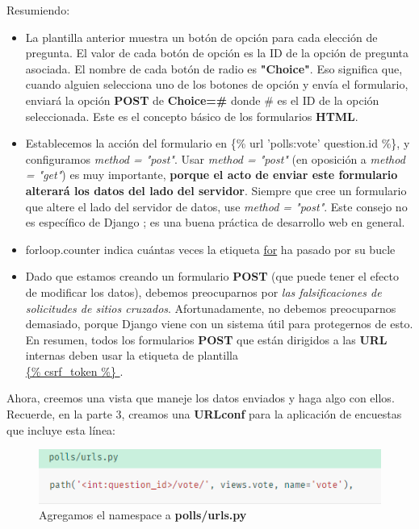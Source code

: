 \documentclass[10pt]{article}
\newcommand{\django}[1]{{\textcolor{G}{Django} #1}}
\begin{document}
Resumiendo:
\begin{itemize}
\item 
La plantilla anterior muestra un botón de opción para cada elección de pregunta. El valor de cada botón de opción es la ID de la opción de pregunta asociada. El nombre de cada botón de radio es \textbf{"Choice"}. Eso significa que, cuando alguien selecciona uno de los botones de opción y envía el formulario, enviará la opción \textbf{POST} de \textbf{Choice=\#} donde \# es el ID de la opción seleccionada. Este es el concepto básico de los formularios \textbf{HTML}.

\item
Establecemos la acción del formulario en \textcolor{R}{\{\% url 'polls:vote' question.id \%\}}, y configuramos \textit{method = "post"}. Usar \textit{method = "post"} (en oposición a \textit{method = "get"}) es muy importante, \textbf{porque el acto de enviar este formulario alterará los datos del lado del servidor}. Siempre que cree un formulario que altere el lado del servidor de datos, use \textit{method = "post"}. Este consejo no es específico de \django{}; es una buena práctica de desarrollo web en general.

\item
\textcolor{G}{forloop.counter} indica cuántas veces la etiqueta {\href{https://docs.djangoproject.com/en/3.0/ref/templates/builtins/\#std:templatetag-for}{\textcolor{B}{for}}} ha pasado por su bucle
\item
Dado que estamos creando un formulario \textbf{POST} (que puede tener el efecto de modificar los datos), debemos preocuparnos por \textit{las falsificaciones de solicitudes de sitios cruzados}. Afortunadamente, no debemos preocuparnos demasiado, porque \django{} viene con un sistema útil para protegernos de esto. En resumen, todos los formularios \textbf{POST} que están dirigidos a las \textbf{URL} internas deben usar la etiqueta de plantilla\\ {\href{https://docs.djangoproject.com/en/3.0/ref/templates/builtins/\#std:templatetag-csrf_token}{\textcolor{B}{\{\% csrf\_token \%\} }}}.
\end{itemize}

Ahora, creemos una vista que maneje los datos enviados y haga algo con ellos. Recuerde, en la parte 3, creamos una \textbf{URLconf} para la aplicación de encuestas que incluye esta línea:

\begin{figure}[H]
\begin{center}
\includegraphics[scale=1]{figuras/3/34/341/img2.png}
\caption{Agregamos el namespace a \textbf{polls/urls.py}}
\end{center}
\end{figure}
\end{document}

